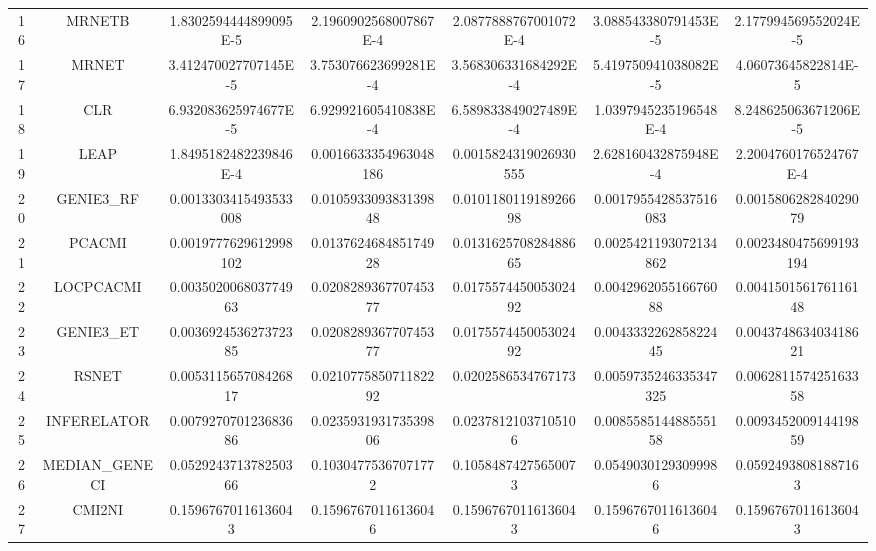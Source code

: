 \documentclass[a4paper,10pt]{article}
\begin{document}
\begin{landscape}
\begin{table}[!htp]
\begin{tabular}{ccccccc}
16&MRNETB&1.8302594444899095E-5&2.1960902568007867E-4&2.0877888767001072E-4&3.088543380791453E-5&2.177994569552024E-5\\
17&MRNET&3.412470027707145E-5&3.753076623699281E-4&3.568306331684292E-4&5.419750941038082E-5&4.06073645822814E-5\\
18&CLR&6.932083625974677E-5&6.929921605410838E-4&6.589833849027489E-4&1.0397945235196548E-4&8.248625063671206E-5\\
19&LEAP&1.8495182482239846E-4&0.0016633354963048186&0.0015824319026930555&2.628160432875948E-4&2.2004760176524767E-4\\
20&GENIE3_RF&0.0013303415493533008&0.010593309383139848&0.010118011918926698&0.0017955428537516083&0.001580628284029079\\
21&PCACMI&0.0019777629612998102&0.013762468485174928&0.013162570828488665&0.0025421193072134862&0.0023480475699193194\\
22&LOCPCACMI&0.003502006803774963&0.020828936770745377&0.017557445005302492&0.004296205516676088&0.004150156176116148\\
23&GENIE3_ET&0.003692453627372385&0.020828936770745377&0.017557445005302492&0.004333226285822445&0.004374863403418621\\
24&RSNET&0.005311565708426817&0.021077585071182292&0.0202586534767173&0.0059735246335347325&0.006281157425163358\\
25&INFERELATOR&0.007927070123683686&0.023593193173539806&0.02378121037105106&0.008558514488555158&0.009345200914419859\\
26&MEDIAN_GENECI&0.052924371378250366&0.10304775367071772&0.10584874275650073&0.05490301293099986&0.05924938081887163\\
27&CMI2NI&0.15967670116136043&0.15967670116136046&0.15967670116136043&0.15967670116136046&0.15967670116136043\\
\hline
\end{tabular}
\end{table}


\newpage


\end{landscape}
\end{document}
